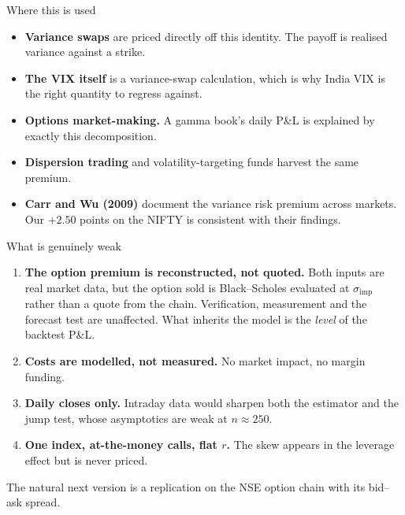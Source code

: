 \documentclass[aspectratio=169,11pt]{beamer}
\newcommand{\lead}[1]{{\sffamily\bfseries\color{accent}#1}}
\newcommand{\si}{\sigma_{\mathrm{imp}}}
\begin{document}
\begin{frame}{Where this is used}
\begin{itemize}\itemsep3pt
  \item \lead{Variance swaps} are priced directly off this identity. The payoff is realised
        variance against a strike.
  \item \lead{The VIX itself} is a variance-swap calculation, which is why India VIX is the
        right quantity to regress against.
  \item \lead{Options market-making.} A gamma book's daily P\&L is explained by exactly this
        decomposition.
  \item \lead{Dispersion trading} and volatility-targeting funds harvest the same premium.
  \item \lead{Carr and Wu (2009)} document the variance risk premium across markets. Our
        $+2.50$ points on the NIFTY is consistent with their findings.
\end{itemize}
\end{frame}

\begin{frame}{What is genuinely weak}
\begin{enumerate}\itemsep3pt
  \item \lead{The option premium is reconstructed, not quoted.} Both inputs are real market
        data, but the option sold is Black--Scholes evaluated at $\si$ rather than a quote from
        the chain. Verification, measurement and the forecast test are unaffected. What
        inherits the model is the \emph{level} of the backtest P\&L.
  \item \lead{Costs are modelled, not measured.} No market impact, no margin funding.
  \item \lead{Daily closes only.} Intraday data would sharpen both the estimator and the jump
        test, whose asymptotics are weak at $n\approx250$.
  \item \lead{One index, at-the-money calls, flat $r$.} The skew appears in the leverage effect
        but is never priced.
\end{enumerate}
\vspace{0.5em}
The natural next version is a replication on the NSE option chain with its bid--ask spread.
\end{frame}
\end{document}
